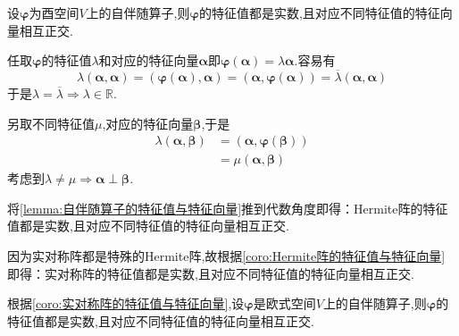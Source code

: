 \begin{green}
    \begin{lemma}[自伴随算子的特征值与特征向量]\label{lemma:自伴随算子的特征值与特征向量}
        设$\bm{\varphi}$为酉空间$V$上的自伴随算子,则$\bm{\varphi}$的特征值都是实数,且对应不同特征值的特征向量相互正交.
    \end{lemma}
    \begin{Proof}
        任取$\bm{\varphi}$的特征值$\lambda$和对应的特征向量$\bm{\alpha}$即$\bm{\varphi}\left(\bm{\alpha}\right)=\lambda\bm{\alpha}$.容易有\[
        \lambda\left(
            \bm{\alpha},\bm{\alpha}
        \right)=\left(
            \bm{\varphi}\left(\bm{\alpha}\right),\bm{\alpha}
        \right)=\left(
            \bm{\alpha},\bm{\varphi}\left(\bm{\alpha}\right)
        \right)=\overline{\lambda}\left(
            \bm{\alpha},\bm{\alpha}
        \right)
        \]于是$\lambda=\overline{\lambda}\Longrightarrow\lambda\in\mathbb{R}$.

        另取不同特征值$\mu$,对应的特征向量$\bm{\beta}$,于是\begin{align*}
            \lambda\left(
                \bm{\alpha},\bm{\beta}
            \right)&=\left(
                \bm{\alpha},\bm{\varphi}\left(\bm{\beta}\right)
            \right)\\
            &=\mu\left(
                \bm{\alpha},\bm{\beta}
            \right)
        \end{align*}考虑到$\lambda\neq\mu\Longrightarrow\bm{\alpha}\perp\bm{\beta}.$
    \end{Proof}
\end{green}
\begin{green}
    \begin{corollary}[Hermite阵的特征值与特征向量]\label{coro:Hermite阵的特征值与特征向量}
        将\cref{lemma:自伴随算子的特征值与特征向量}推到代数角度即得：\textup{Hermite}阵的特征值都是实数,且对应不同特征值的特征向量相互正交.
    \end{corollary}
\end{green}
\begin{green}
    \begin{corollary}[实对称阵的特征值与特征向量]\label{coro:实对称阵的特征值与特征向量}
        因为实对称阵都是特殊的\textup{Hermite}阵,故根据\cref{coro:Hermite阵的特征值与特征向量}即得：实对称阵的特征值都是实数,且对应不同特征值的特征向量相互正交.
    \end{corollary}
\end{green}
\begin{green}
    \begin{corollary}[欧式空间的自伴随算子的特征值与特征向量]\label{coro:欧式空间的自伴随算子的特征值与特征向量}
        根据\cref{coro:实对称阵的特征值与特征向量},设$\bm{\varphi}$是欧式空间$V$上的自伴随算子,则$\bm{\varphi}$的特征值都是实数,且对应不同特征值的特征向量相互正交.
    \end{corollary}
\end{green}
